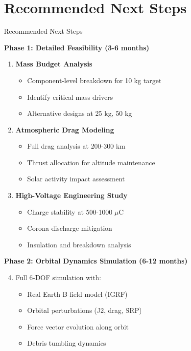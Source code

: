 \documentclass[11pt]{beamer}
\begin{document}
\section{Recommended Next Steps}

\begin{frame}{Recommended Next Steps}

\textbf{Phase 1: Detailed Feasibility (3-6 months)}
\begin{enumerate}
\item \textbf{Mass Budget Analysis}
\begin{itemize}
\item Component-level breakdown for 10 kg target
\item Identify critical mass drivers
\item Alternative designs at 25 kg, 50 kg
\end{itemize}

\item \textbf{Atmospheric Drag Modeling}
\begin{itemize}
\item Full drag analysis at 200-300 km
\item Thrust allocation for altitude maintenance
\item Solar activity impact assessment
\end{itemize}

\item \textbf{High-Voltage Engineering Study}
\begin{itemize}
\item Charge stability at 500-1000 $\mu$C
\item Corona discharge mitigation
\item Insulation and breakdown analysis
\end{itemize}
\end{enumerate}

\vspace{0.2cm}

\textbf{Phase 2: Orbital Dynamics Simulation (6-12 months)}
\begin{enumerate}
\setcounter{enumi}{3}
\item Full 6-DOF simulation with:
\begin{itemize}
\item Real Earth B-field model (IGRF)
\item Orbital perturbations (J2, drag, SRP)
\item Force vector evolution along orbit
\item Debris tumbling dynamics
\end{itemize}
\end{enumerate}

\end{frame}
\end{document}
